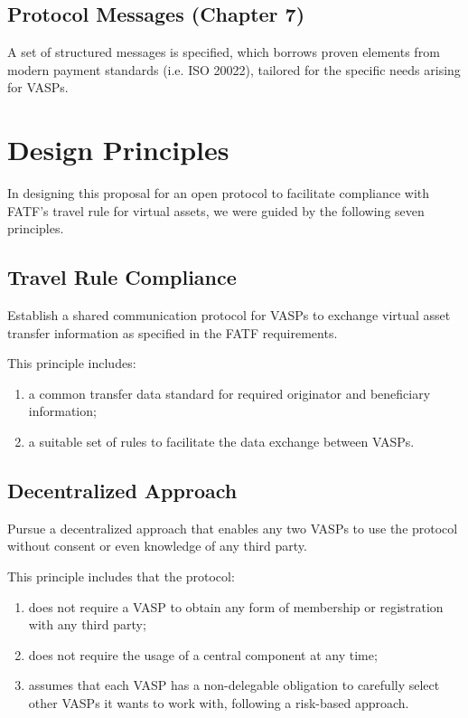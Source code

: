 \documentclass{article}
\begin{document}
\subsection*{Protocol Messages (Chapter 7)}
A set of structured messages is specified, which borrows proven elements from modern payment standards (i.e. ISO 20022), tailored for the specific needs arising for VASPs.

\newpage

    
\section{Design Principles}
In designing this proposal for an open protocol to facilitate compliance with FATF's travel rule for virtual assets, we were guided by the following seven principles.


\subsection{Travel Rule Compliance}
    \begin{mdframed}[backgroundcolor=gray!20] 
        Establish a shared communication protocol for VASPs to exchange virtual asset transfer information as specified in the FATF requirements.
    \end{mdframed}
This principle includes:
\renewcommand{\theenumi}{\alph{enumi}}
 \begin{enumerate}
   \item a common transfer data standard for required originator and beneficiary information;
   \item a suitable set of rules to facilitate the data exchange between VASPs.
  \end{enumerate}
 
\subsection{Decentralized Approach}
    \begin{mdframed}[backgroundcolor=gray!20] 
    Pursue a decentralized approach that enables any two VASPs to use the protocol without consent or even knowledge of any third party.
    \end{mdframed}
This principle includes that the protocol:
\renewcommand{\theenumi}{\alph{enumi}}
 \begin{enumerate}
   \item does not require a VASP to obtain any form of membership or registration with any third party;
   \item does not require the usage of a central component at any time;
   \item assumes that each VASP has a non-delegable obligation to carefully select other VASPs it wants to work with, following a risk-based approach.
  \end{enumerate}
  
\end{document}
